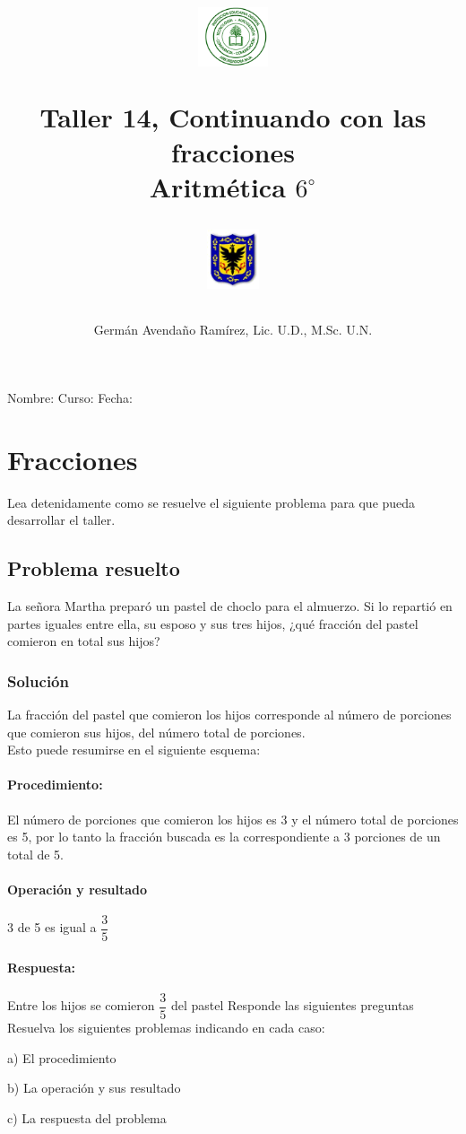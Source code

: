 \documentclass[10pt,twoside]{article}
\author{Germ\'an Avenda\~no Ram\'irez, Lic. U.D., M.Sc. U.N.}
\title{\begin{minipage}{.2\textwidth}
\includegraphics[height=1.75cm]{Images/logo-colegio.png}\end{minipage}
\begin{minipage}{.55\textwidth}
\begin{center}
Taller 14, Continuando con las fracciones \\
Aritmética $6^{\circ}$
\end{center}
\end{minipage}\hfill
\begin{minipage}{.2\textwidth}
\includegraphics[height=1.75cm]{Images/logo-sed.png} 
\end{minipage}}
\date{}
\begin{document}
\maketitle
Nombre: \hrulefill Curso: \underline{\hspace*{44pt}} Fecha: \underline{\hspace*{2.5cm}}
\section*{Fracciones}
Lea detenidamente como se resuelve el siguiente problema para que pueda desarrollar el taller.
\subsection*{Problema resuelto}
La señora Martha prepar\'{o} un pastel de choclo para el almuerzo. Si lo reparti\'{o} en partes iguales entre ella, su esposo y sus tres hijos, ¿qu\'{e} fracci\'{o}n del pastel comieron en total sus hijos?
\subsubsection*{Soluci\'{o}n}
La fracci\'{o}n del pastel que comieron los hijos corresponde al n\'{u}mero de porciones que comieron sus hijos, del n\'{u}mero total de porciones.\\
Esto puede resumirse en el siguiente esquema:
\paragraph*{Procedimiento:}
El n\'{u}mero de porciones que comieron los hijos es 3 y el n\'{u}mero total de porciones es 5, por lo tanto la fracci\'{o}n buscada es la correspondiente a 3 porciones de un total de 5.
\paragraph*{Operaci\'{o}n y resultado}
3 de 5 es igual a \hspace*{.5cm} $\dfrac{3}{5}$
\paragraph*{Respuesta:}
Entre los hijos se comieron $\dfrac{3}{5}$ del pastel
Responde las siguientes preguntas\\
Resuelva los siguientes problemas indicando en cada caso:
\begin{enumerate}
\begin{multicols}{2}
\item[a)] El procedimiento
\item[b)] La operación y sus resultado
\item[c)] La respuesta del problema\end{multicols}
\end{enumerate}
\end{document}
